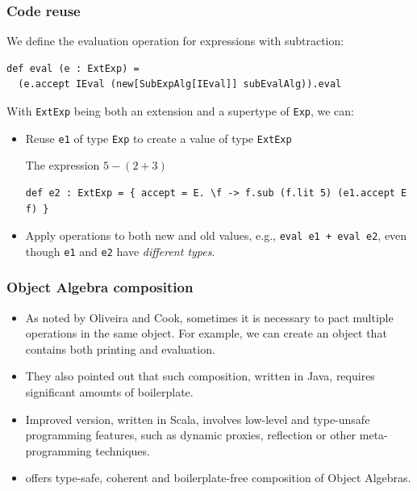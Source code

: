 \documentclass{beamer}
\begin{document}
\begin{frame}[fragile]
  \frametitle{Code reuse}

We define the evaluation operation for expressions with subtraction:

\begin{exampleblock}{}
\begin{lstlisting}
def eval (e : ExtExp) =
  (e.accept IEval (new[SubExpAlg[IEval]] subEvalAlg)).eval
\end{lstlisting}
\end{exampleblock}

\pause

With \lstinline{ExtExp} being both an extension and a supertype of
\lstinline{Exp}, we can:

\pause

\begin{itemize}
\item Reuse \lstinline{e1} of type \lstinline{Exp} to create a value of type
  \lstinline{ExtExp}
  \begin{exampleblock}{The expression $5 - (2 + 3)$}
\begin{lstlisting}
def e2 : ExtExp = { accept = E. \f -> f.sub (f.lit 5) (e1.accept E f) }
\end{lstlisting}
\end{exampleblock}

\pause

\item Apply operations to both new and old values, e.g., \lstinline{eval e1 + eval e2},
  even though \lstinline{e1} and \lstinline{e2} have \textit{different types}.

\end{itemize}


\end{frame}


\begin{frame}
  \frametitle{Object Algebra composition}

  \begin{itemize}[<+->]
  \item As noted by Oliveira and Cook, sometimes it is necessary to pact multiple
  operations in the same object. For example, we can create an object that
  contains both printing and evaluation.
  \item They also pointed out that such composition, written in Java, requires
    significant amounts of boilerplate.
  \item Improved version, written in Scala, involves low-level and type-unsafe
    programming features, such as dynamic proxies, reflection or other
    meta-programming techniques.
  \item \name offers type-safe, coherent and boilerplate-free composition of
    Object Algebras.

  \end{itemize}

\end{frame}
\end{document}
